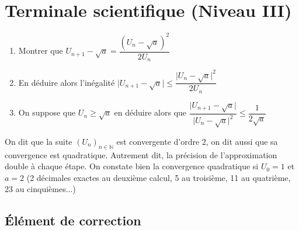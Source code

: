 \documentclass[french]{article}
\begin{document}
\section*{Terminale scientifique (Niveau III)}
\begin{enumerate}
\item Montrer que $U_{n+1}-\sqrt{a}=\dfrac{(U_n-\sqrt{a})^2}{2U_n}$
\item En déduire alors l'inégalité $\vert U_{n+1}-\sqrt{a} \vert \leq \dfrac{\vert U_n-\sqrt{a}\vert ^2}{2U_n}$ 
\item On suppose que $U_n \geq \sqrt{a}$  en déduire alors que $ \dfrac{\vert U_{n+1}-\sqrt{a} \vert}{\vert U_n-\sqrt{a}\vert ^2} \leq \dfrac{1}{2\sqrt{a}}$
\end{enumerate}

On dit que la suite $(U_n)_{n\in \mathbb{N}} $ est convergente d'ordre 2, on dit aussi que sa convergence est quadratique. Autrement dit, la précision de l'approximation double à chaque étape. On constate bien la convergence quadratique si $U_0=1$ et $a=2$ (2 décimales exactes au deuxième calcul, 5 au troisième, 11 au quatrième, 23 au cinquièmes...) 

\newpage 
\begin{center}
\section*{Élément de correction}
\end{center}
\renewcommand{\arraystretch}{2.5}
\end{document}
